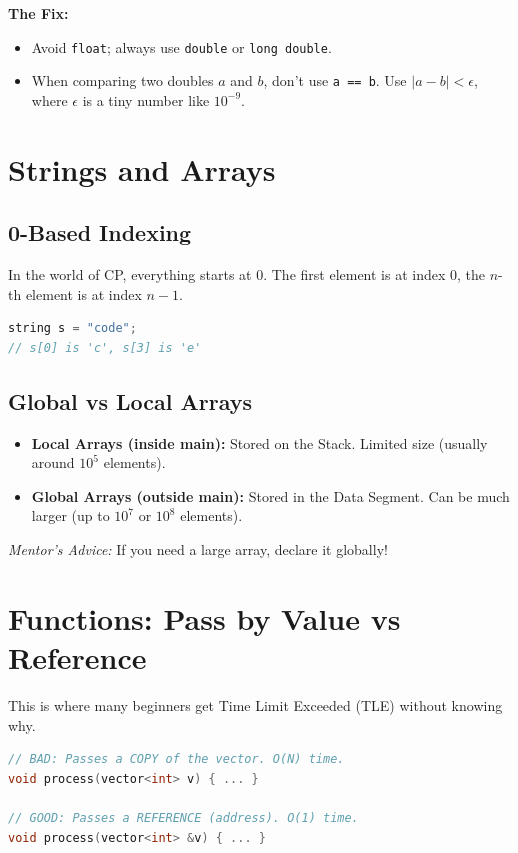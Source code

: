 \documentclass[12pt, a4paper]{report}
\begin{document}
\textbf{The Fix:}
\begin{itemize}
    \item Avoid \texttt{float}; always use \texttt{double} or \texttt{long double}.
    \item When comparing two doubles $a$ and $b$, don't use \texttt{a == b}. Use $|a - b| < \epsilon$, where $\epsilon$ is a tiny number like $10^{-9}$.
\end{itemize}

\section{Strings and Arrays}
\subsection{0-Based Indexing}
In the world of CP, everything starts at 0. The first element is at index 0, the $n$-th element is at index $n-1$.
\begin{lstlisting}[language=C++]
string s = "code";
// s[0] is 'c', s[3] is 'e'
\end{lstlisting}

\subsection{Global vs Local Arrays}
\begin{itemize}
    \item \textbf{Local Arrays (inside main):} Stored on the Stack. Limited size (usually around $10^5$ elements).
    \item \textbf{Global Arrays (outside main):} Stored in the Data Segment. Can be much larger (up to $10^7$ or $10^8$ elements).
\end{itemize}
\textit{Mentor's Advice:} If you need a large array, declare it globally!

\section{Functions: Pass by Value vs Reference}
This is where many beginners get Time Limit Exceeded (TLE) without knowing why.

\begin{lstlisting}[language=C++]
// BAD: Passes a COPY of the vector. O(N) time.
void process(vector<int> v) { ... }

// GOOD: Passes a REFERENCE (address). O(1) time.
void process(vector<int> &v) { ... }
\end{lstlisting}
\end{document}
